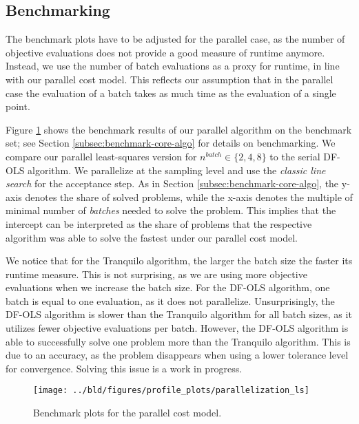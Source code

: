 \restoregeometry

\subsection{Benchmarking}\label{subsec:parallelization::benchmarking}

The benchmark plots have to be adjusted for the parallel case, as the number of objective
evaluations does not provide a good measure of runtime anymore. Instead, we use the number of batch
evaluations as a proxy for runtime, in line with our parallel cost model. This reflects our
assumption that in the parallel case the evaluation of a batch takes as much time as the evaluation
of a single point.

Figure \ref{fig:parallelization::benchmark} shows the benchmark results of our parallel algorithm on
the \cite{MoreWild2009} benchmark set; see Section \ref{subsec:benchmark-core-algo} for details on
benchmarking. We compare our parallel least-squares version for $n^{batch} \in \{2, 4, 8\}$ to the
serial DF-OLS algorithm. We parallelize at the sampling level and use the \emph{classic line search}
for the acceptance step. As
in Section \ref{subsec:benchmark-core-algo}, the y-axis denotes the share of solved problems, while
the x-axis denotes the multiple of minimal number of \emph{batches} needed to solve the problem.
This implies that the intercept can be interpreted as the share of problems that the respective
algorithm was able to solve the fastest under our parallel cost model.

We notice that for the
Tranquilo algorithm, the larger the batch size the faster its runtime measure. This is not
surprising, as we are using more objective evaluations when we increase the batch size. For the
DF-OLS algorithm, one batch is equal to one evaluation, as it does not parallelize. Unsurprisingly,
the DF-OLS algorithm is slower than the Tranquilo algorithm for all batch sizes, as it utilizes
fewer objective evaluations per batch. However, the DF-OLS algorithm is able to successfully
solve one problem more than the Tranquilo algorithm. This is due to an accuracy, as the problem
disappears when using a lower tolerance level for convergence. Solving this issue is a work in
progress.

\begin{figure}
    \texttt{[image: ../bld/figures/profile\_plots/parallelization\_ls]}
    \caption{Benchmark plots for the parallel cost model.}
    \label{fig:parallelization::benchmark}
\end{figure}
